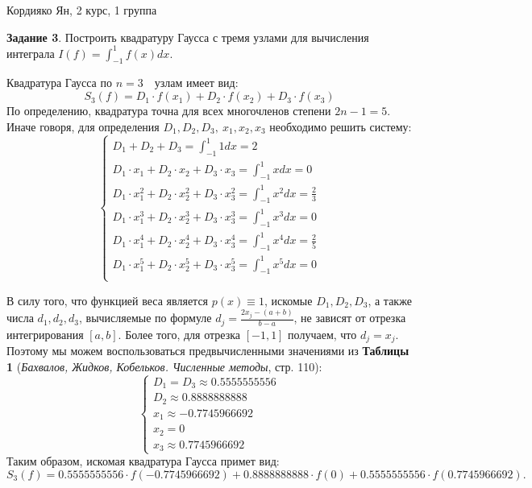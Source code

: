 \documentclass[fleqn]{article}
\begin{document}
Кордияко Ян, 2 курс, 1 группа

\textbf {Задание 3}. Построить квадратуру Гаусса с тремя узлами для вычисления интеграла
$I(f) = \int_{-1}^1 f(x) dx$.

Квадратура Гаусса по $n = 3$\  \  узлам имеет вид:
\begin{equation*}
	S_3(f) = D_1\cdot{}f(x_1) + D_2\cdot{}f(x_2) + D_3\cdot{}f(x_3)
\end{equation*}
По определению, квадратура точна для всех многочленов степени $2n - 1 = 5$. Иначе
говоря, для определения $D_1, D_2, D_3,\  x_1, x_2, x_3$ необходимо решить систему:
\begin{equation*}
	\begin{cases}
	D_1 + D_2 + D_3 =   \int_{-1}^1 1 dx= 2\\
	D_1\cdot{}x_1 + D_2\cdot{}x_2 + D_3\cdot{}x_3 =   \int_{-1}^1 x dx = 0\\
	D_1\cdot{}x_1^2 + D_2\cdot{}x_2^2 + D_3\cdot{}x_3^2 =   \int_{-1}^1 x^2 dx = \frac23\\
	D_1\cdot{}x_1^3 + D_2\cdot{}x_2^3 + D_3\cdot{}x_3^3 =   \int_{-1}^1 x^3  dx = 0\\
	D_1\cdot{}x_1^4 + D_2\cdot{}x_2^4 + D_3\cdot{}x_3^4 =   \int_{-1}^1 x^4 dx = \frac25\\
	D_1\cdot{}x_1^5 + D_2\cdot{}x_2^5 + D_3\cdot{}x_3^5 =   \int_{-1}^1 x^5 dx = 0\\
	\end{cases}
\end{equation*}

В силу того, что функцией веса является $p(x) \equiv 1$,  искомые $D_1, D_2, D_3$, а
также числа $d_1, d_2, d_3$, вычисляемые по формуле $d_j = \frac{2x_j - (a+b)}{b - a}$,
не зависят от отрезка интегрирования $[a, b]$. Более того, для отрезка
$[-1, 1]$ получаем, что $d_j = x_j$. Поэтому мы можем воспользоваться 
предвычисленными значениями из \textbf {Таблицы 1} 
(\emph{Бахвалов, Жидков, Кобельков. Численные методы}, стр. 110):
\begin{equation*}
	\begin{cases}
	D_1  = D_3 \approx 0.5555555556 \\
	D_2 \approx 0.8888888888 \\
	x_1 \approx - 0.7745966692 \\
	x_2 = 0 \\
	x_3 \approx  0.7745966692
	\end{cases}
\end{equation*}
Таким образом, искомая квадратура Гаусса примет вид: 
\begin{equation*}
	S_3(f) = 0.5555555556\cdot{}f(- 0.7745966692) +
	0.8888888888\cdot{}f(0) + 
	0.5555555556\cdot{}f(0.7745966692).
\end{equation*}
\end{document}
